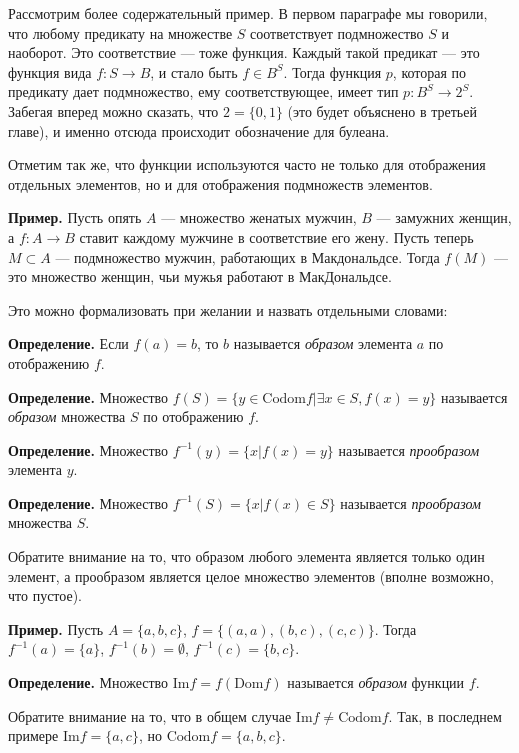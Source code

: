 Рассмотрим более содержательный пример. В первом параграфе мы говорили, что любому предикату на множестве $S$ соответствует подмножество $S$ и наоборот. Это соответствие — тоже функция. Каждый такой предикат — это функция вида $f:S\to B$, и стало быть $f\in B^S$. Тогда функция $p$, которая по предикату дает подмножество, ему соответствующее, имеет тип $p:B^S \to 2^S$. Забегая вперед можно сказать, что $2=\{0, 1\}$ (это будет объяснено в третьей главе), и именно отсюда происходит обозначение для булеана.

Отметим так же, что функции используются часто не только для отображения отдельных элементов, но и для отображения подмножеств элементов.

{\bfseries Пример.} Пусть опять $A$ — множество женатых мужчин, $B$ — замужних женщин, а $f: A\to B$ ставит каждому мужчине в соответствие его жену. Пусть теперь $M\subset A$ — подмножество мужчин, работающих в Макдональдсе. Тогда $f(M)$ — это множество женщин, чьи мужья работают в МакДональдсе.

Это можно формализовать при желании и назвать отдельными словами:

{\bfseries Определение.} Если $f(a) = b$, то $b$ называется {\slshape образом} элемента $a$ по отображению $f$.

{\bfseries Определение.} Множество $f(S) = \{y\in \mathrm{Codom}f|\exists x \in S, f(x) = y \}$ называется {\slshape образом} множества $S$ по отображению $f$.

{\bfseries Определение.} Множество $f^{-1}(y) = \{x | f(x) = y \}$ называется {\slshape прообразом} элемента $y$.

{\bfseries Определение.} Множество $f^{-1}(S) = \{x | f(x) \in S \}$ называется {\slshape прообразом} множества $S$.

Обратите внимание на то, что образом любого элемента является только один элемент, а прообразом является целое множество элементов (вполне возможно, что пустое).

{\bfseries Пример.} Пусть $A = \{a, b, c\}$, $f = \{(a, a), (b, c), (c, c)\}$. Тогда $f^{-1}(a) = \{a\}$, $f^{-1}(b) = \emptyset$, $f^{-1}(c) = \{b, c\}$.

{\bfseries Определение.} Множество $\mathrm{Im} f = f(\mathrm{Dom} f)$ называется {\slshape образом} функции $f$.

Обратите внимание на то, что в общем случае $\mathrm{Im} f \not= \mathrm{Codom} f$. Так, в последнем примере $\mathrm{Im} f = \{a, c\}$, но $\mathrm{Codom}f = \{a, b, c\}$.

